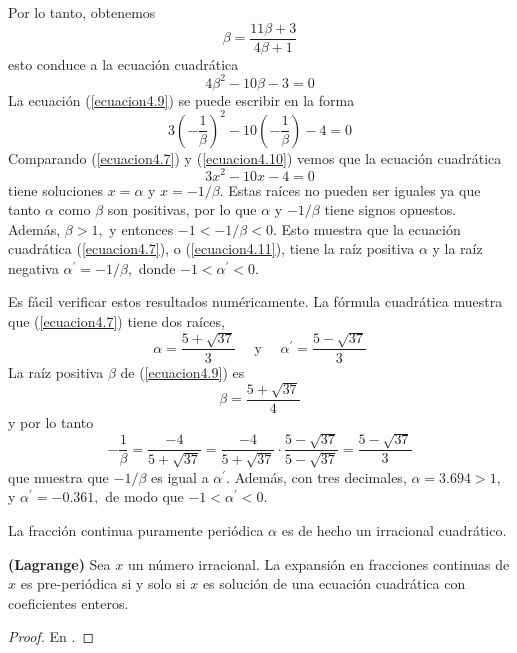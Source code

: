 \begin{ejem}
    Por lo tanto, obtenemos
    \begin{equation}
        \beta=\frac{11 \beta+3}{4 \beta+1}
        \label{ecuacion4.8}
    \end{equation}
    esto conduce a la ecuación cuadrática
    \begin{equation}
            4 \beta^{2}-10 \beta-3=0
            \label{ecuacion4.9}
    \end{equation}
    La ecuación (\ref{ecuacion4.9}) se puede escribir en la forma
    \begin{equation}
        3\left(-\frac{1}{\beta}\right)^{2}-10\left(-\frac{1}{\beta}\right)-4=0
        \label{ecuacion4.10}
    \end{equation}
    Comparando (\ref{ecuacion4.7}) y (\ref{ecuacion4.10}) vemos que la ecuación cuadrática
    \begin{equation}
    3 x^{2}-10 x-4=0
    \label{ecuacion4.11}
    \end{equation}
    tiene soluciones $ x = \alpha $ y $ x = -1 / \beta. $ Estas raíces no pueden ser iguales ya que tanto $ \alpha $ como $ \beta $ son positivas, por lo que $ \alpha $ y $ -1 / \beta $ tiene signos opuestos. Además, $ \beta> 1, $ y entonces $ -1 <-1 / \beta <0. $ Esto muestra que la ecuación cuadrática (\ref{ecuacion4.7}),  o  (\ref{ecuacion4.11}), tiene la raíz positiva $ \alpha $ y la raíz negativa $ \alpha ^ {\prime} = - 1 / \beta, $ donde $ -1 <\alpha ^ {\prime} <0. $
    
    Es fácil verificar estos resultados numéricamente. La fórmula cuadrática muestra que (\ref{ecuacion4.7}) tiene dos raíces,
    $$
    \alpha=\frac{5+\sqrt{37}}{3} \quad \text { y } \quad \alpha^{\prime}=\frac{5-\sqrt{37}}{3}
    $$
    La raíz positiva $\beta$ de (\ref{ecuacion4.9}) es
    $$
    \beta=\frac{5+\sqrt{37}}{4}
    $$
    y por lo tanto
    $$
    -\frac{1}{\beta}=\frac{-4}{5+\sqrt{37}}=\frac{-4}{5+\sqrt{37}} \cdot \frac{5-\sqrt{37}}{5-\sqrt{37}}=\frac{5-\sqrt{37}}{3}
    $$
    que muestra que $ -1 / \beta $ es igual a $ \alpha ^ {\prime}. $ Además, con tres decimales, $ \alpha = 3.694> 1, $ y $ \alpha^{\prime}= -0.361 , $ de modo que $ -1 <\alpha^{\prime} <0. $

    La fracción continua puramente periódica $ \alpha $ es de hecho un irracional cuadrático.
\end{ejem}
\begin{teo}
\textbf{(Lagrange)} Sea $x$ un número irracional. La expansión en fracciones continuas de $x$ es pre-periódica si y solo si $x$ es solución de una ecuación cuadrática con coeficientes enteros.
\label{Lagrange}
\end{teo}
\begin{proof}
En \cite{Portugues}.
\end{proof}

